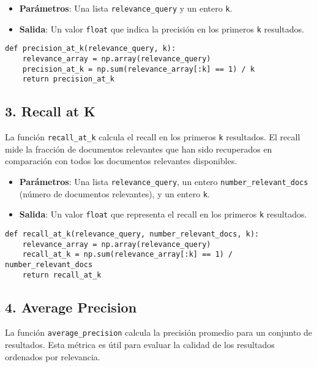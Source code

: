 \documentclass[11pt,english]{article}
\theoremstyle{plain}
\begin{document}
\begin{itemize}
    \item \textbf{Parámetros}: Una lista \texttt{relevance\_query} y un entero \texttt{k}.
    \item \textbf{Salida}: Un valor \texttt{float} que indica la precisión en los primeros \texttt{k} resultados.
\end{itemize}

\begin{verbatim}
def precision_at_k(relevance_query, k):
    relevance_array = np.array(relevance_query)
    precision_at_k = np.sum(relevance_array[:k] == 1) / k
    return precision_at_k
\end{verbatim}

\subsection*{3. Recall at K}

La función \texttt{recall\_at\_k} calcula el recall en los primeros \texttt{k} resultados. El recall mide la fracción de documentos relevantes que han sido recuperados en comparación con todos los documentos relevantes disponibles.

\begin{itemize}
    \item \textbf{Parámetros}: Una lista \texttt{relevance\_query}, un entero \texttt{number\_relevant\_docs} (número de documentos relevantes), y un entero \texttt{k}.
    \item \textbf{Salida}: Un valor \texttt{float} que representa el recall en los primeros \texttt{k} resultados.
\end{itemize}

\begin{verbatim}
def recall_at_k(relevance_query, number_relevant_docs, k):
    relevance_array = np.array(relevance_query)
    recall_at_k = np.sum(relevance_array[:k] == 1) / number_relevant_docs
    return recall_at_k
\end{verbatim}

\subsection*{4. Average Precision}

La función \texttt{average\_precision} calcula la precisión promedio para un conjunto de resultados. Esta métrica es útil para evaluar la calidad de los resultados ordenados por relevancia.
\end{document}
